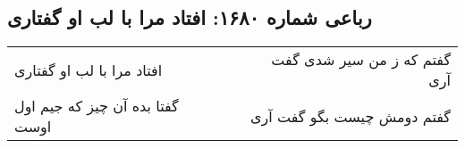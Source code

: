 \begin{center}
\section*{رباعی شماره ۱۶۸۰: افتاد مرا با لب او گفتاری}
\label{sec:1680}
\begin{longtable}{l p{0.5cm} r}
افتاد مرا با لب او گفتاری
&&
گفتم که ز من سیر شدی گفت آری
\\
گفتا بده آن چیز که جیم اول اوست
&&
گفتم دومش چیست بگو گفت آری
\\
\end{longtable}
\end{center}
